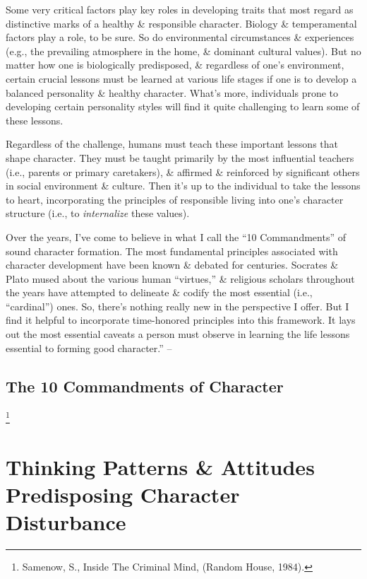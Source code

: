 \documentclass{article}
\numberwithin{equation}{section}
\begin{document}
Some very critical factors play key roles in developing traits that most regard as distinctive marks of a healthy \& responsible character. Biology \& temperamental factors play a role, to be sure. So do environmental circumstances \& experiences (e.g., the prevailing atmosphere in the home, \& dominant cultural values). But no matter how one is biologically predisposed, \& regardless of one's environment, certain crucial lessons must be learned at various life stages if one is to develop a balanced personality \& healthy character. What's more, individuals prone to developing certain personality styles will find it quite challenging to learn some of these lessons.

Regardless of the challenge, humans must teach these important lessons that shape character. They must be taught primarily by the most influential teachers (i.e., parents or primary caretakers), \& affirmed \& reinforced by significant others in social environment \& culture. Then it's up to the individual to take the lessons to heart, incorporating the principles of responsible living into one's character structure (i.e., to \textit{internalize} these values).

Over the years, I've come to believe in what I call the ``10 Commandments'' of sound character formation. The most fundamental principles associated with character development have been known \& debated for centuries. Socrates \& Plato mused about the various human ``virtues,'' \& religious scholars throughout the years have attempted to delineate \& codify the most essential (i.e., ``cardinal'') ones. So, there's nothing really new in the perspective I offer. But I find it helpful to incorporate time-honored principles into this framework. It lays out the most essential caveats a person must observe in learning the life lessons essential to forming good character.'' -- \cite[pp. 126--129]{Simon2011}

\subsection{The 10 Commandments of Character}

\footnote{Samenow, S., Inside The Criminal Mind, (Random House, 1984).}


\section{Thinking Patterns \& Attitudes Predisposing Character Disturbance}
\end{document}
